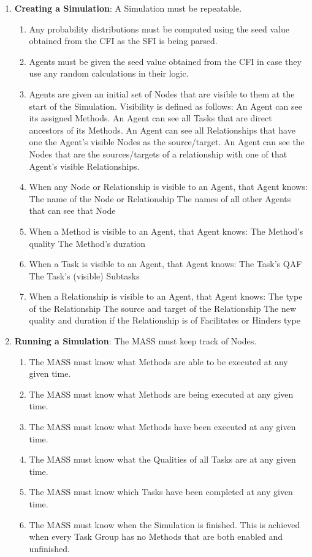 \begin{enumerate}
  \item\textbf{Creating a Simulation}: A Simulation must be repeatable.
   \begin{enumerate}
    \item Any probability distributions must be computed using the seed value obtained from the CFI as the SFI is being parsed.
    \item Agents must be given the seed value obtained from the CFI in case they use any random calculations in their logic.
    \item Agents are given an initial set of Nodes that are visible to them at the start of the Simulation. Visibility is defined as follows:
    	\subitem An Agent can see its assigned Methods.
    	\subitem An Agent can see all Tasks that are direct ancestors of its Methods.
    	\subitem An Agent can see all Relationships that have one the Agent's visible Nodes as the source/target.
    	\subitem An Agent can see the Nodes that are the sources/targets of a relationship with one of that Agent's visible Relationships.
    \item When any Node or Relationship is visible to an Agent, that Agent knows:
    	\subitem The name of the Node or Relationship
    	\subitem The names of all other Agents that can see that Node
    \item When a Method is visible to an Agent, that Agent knows:
   	\subitem The Method's quality
	\subitem The Method's duration
    \item When a Task is visible to an Agent, that Agent knows:
   	\subitem The Task's QAF
   	\subitem The Task's (visible) Subtasks
    \item When a Relationship is visible to an Agent, that Agent knows:
    	\subitem The type of the Relationship
    	\subitem The source and target of the Relationship
    	\subitem The new quality and duration if the Relationship is of Facilitates or Hinders type
  \end{enumerate}
  
  \item\textbf{Running a Simulation}: The MASS must keep track of Nodes.
    \begin{enumerate}
    \item The MASS must know what Methods are able to be executed at any given time.
    \item The MASS must know what Methods are being executed at any given time.
    \item The MASS must know what Methods have been executed at any given time.
    \item The MASS must know what the Qualities of all Tasks are at any given time.
    \item The MASS must know which Tasks have been completed at any given time.
    \item The MASS must know when the Simulation is finished. This is achieved when every Task Group has no Methods that are both enabled and unfinished.
  \end{enumerate}
  

\end{enumerate}
